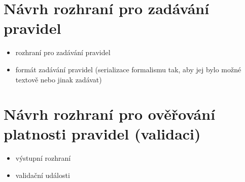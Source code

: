 
\section{Návrh rozhraní pro zadávání pravidel}
\begin{itemize}
\item rozhraní pro zadávání pravidel
\item formát zadávání pravidel (serializace formalismu tak, aby jej bylo možné textově nebo jinak zadávat)
\end{itemize}

\section{Návrh rozhraní pro ověřování platnosti pravidel (validaci)}
\begin{itemize}
\item výstupní rozhraní
\item validační události
\end{itemize}
